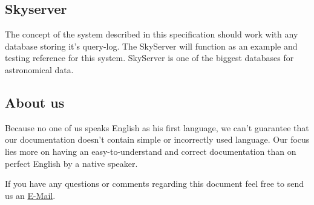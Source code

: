 \subsection*{Skyserver}
The concept of the system described in this specification should work with any database
storing it's query-log. The \gls{SkyServer} will function
as an example and testing reference for this system. SkyServer is one of the biggest databases for astronomical data.
 
\subsection*{About us}
Because no one of us speaks English as his first language,
we can't guarantee that our documentation doesn't contain simple
or incorrectly used language. Our focus lies more on
having an easy-to-understand and correct documentation
than on perfect English by a native speaker.

If you have any questions or comments regarding this document feel free to send us an 
 \href{mailto:pse10-group14-ws12@ira.uni-karlsruhe.de}{E-Mail}.







